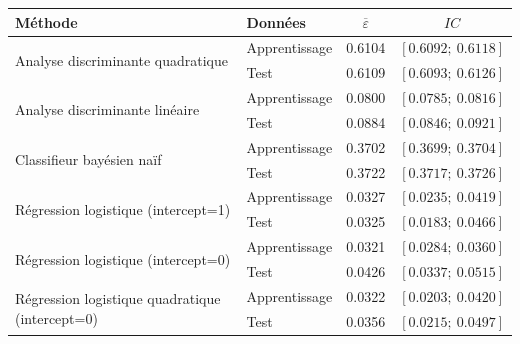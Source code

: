 \documentclass[a4paper,11pt,oneside,roman]{article}
\begin{document}
\begin{table}[H]
\centering

\begin{tabular}{l|l|cc}
\multicolumn{1}{l|}{\textbf{Méthode}}    & \textbf{Données} &$ \overline{\varepsilon}$ & $IC$                      \\ \hline
\multirow{2}{*}{Analyse discriminante quadratique} & Apprentissage    & 0.6104                   & $\left[0.6092 ;~ 0.6118 \right]$  \\
                                       & Test             & 0.6109             & $\left[0.6093  ;~ 0.6126 \right]$ \\ \hline
\multirow{2}{*}{Analyse discriminante linéaire}                  & Apprentissage & 0.0800                                 & $\left[0.0785 ;~ 0.0816 \right]$  \\
                                       & Test             & 0.0884                       & $\left[0.0846  ;~ 0.0921 \right]$ \\ \hline
\multirow{2}{*}{Classifieur bayésien naïf}                  & Apprentissage    & 0.3702                             & $\left[0.3699 ;~ 0.3704 \right]$  \\
                                       & Test             & 0.3722                                 & $\left[0.3717 ;~ 0.3726 \right]$ \\ \hline
\multirow{2}{*}{Régression logistique (intercept=1)}                  & Apprentissage    & 0.0327                             & $\left[0.0235 ;~ 0.0419 \right]$  \\
                                       & Test             & 0.0325                                 & $\left[0.0183;~ 0.0466 \right]$ \\ \hline
\multirow{2}{*}{Régression logistique (intercept=0)}                  & Apprentissage    & 0.0321                           & $\left[0.0284 ;~ 0.0360 \right]$  \\
                                       & Test             & 0.0426                                & $\left[0.0337 ;~ 0.0515 \right]$ \\ \hline
\multirow{2}{*}{Régression logistique quadratique (intercept=0)}                  & Apprentissage    &  0.0322                            & $\left[0.0203 ;~ 0.0420 \right]$  \\
                                       & Test             & 0.0356                                & $\left[0.0215;~ 0.0497 \right]$ \\ \hline

\end{tabular}
\end{table}
\end{document}
